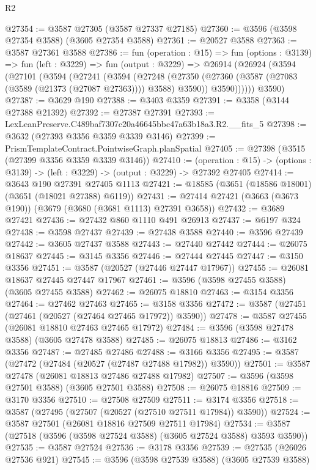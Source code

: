 \begin{lexlean}{R2}
\begin{coremodule}
@27354 := @3587 @27305 (@3587 @27337 @27185)
@27360 := @3596 (@3598 @27354 @3588) (@3605 @27354 @3588)
@27361 := @20527 @3588
@27363 := @3587 @27361 @3588
@27386 := fun (operation : @15) =>
  fun (options : @3139) =>
  fun (left : @3229) =>
  fun (output : @3229) =>
  @26914
    (@26924
      (@3594
        (@27101
          (@3594
            (@27241
              (@3594
                (@27248
                  (@27350 (@27360 (@3587 (@27083 (@3589 (@21373 (@27087 @27363)))) @3588) @3590))
                  @3590))))))
      @3590)
@27387 := @3629 @190
@27388 := @3403 @3359
@27391 := @3358 (@3144 @27388 @21392)
@27392 := @27387 @27391
@27393 := LexLeanPreserve.C489baf7307c20a46645bbc47a63b18a3.R2.__fits_5
@27398 := @3632 (@27393 @3356 @3359 @3339 @3146)
@27399 := PrismTemplateContract.PointwiseGraph.planSpatial
@27405 := @27398 (@3515 (@27399 @3356 @3359 @3339 @3146))
@27410 := (operation : @15) ->
  (options : @3139) -> (left : @3229) -> (output : @3229) -> @27392 @27405
@27414 := @3643 @190 @27391 @27405 @1113
@27421 := @18585 (@3651 (@18586 @18001) (@3651 (@18021 @27388) @6119))
@27431 := @27414 @27421 (@3663 (@3673 @190)) (@3679 (@3680 (@3681 @1113) @27391 @3658))
@27432 := @3689 @27421
@27436 := @27432 @860 @1110 @491 @26913
@27437 := @6197 @324
@27438 := @3598 @27437
@27439 := @27438 @3588
@27440 := @3596 @27439
@27442 := @3605 @27437 @3588
@27443 := @27440 @27442
@27444 := @26075 @18637
@27445 := @3145 @3356
@27446 := @27444 @27445
@27447 := @3150 @3356
@27451 := @3587 (@20527 (@27446 @27447 @17967))
@27455 := @26081 @18637 @27445 @27447 @17967
@27461 := @3596 (@3598 @27455 @3588) (@3605 @27455 @3588)
@27462 := @26075 @18810
@27463 := @3154 @3356
@27464 := @27462 @27463
@27465 := @3158 @3356
@27472 := @3587 (@27451 (@27461 (@20527 (@27464 @27465 @17972)) @3590))
@27478 := @3587 @27455 (@26081 @18810 @27463 @27465 @17972)
@27484 := @3596 (@3598 @27478 @3588) (@3605 @27478 @3588)
@27485 := @26075 @18813
@27486 := @3162 @3356
@27487 := @27485 @27486
@27488 := @3166 @3356
@27495 := @3587 (@27472 (@27484 (@20527 (@27487 @27488 @17982)) @3590))
@27501 := @3587 @27478 (@26081 @18813 @27486 @27488 @17982)
@27507 := @3596 (@3598 @27501 @3588) (@3605 @27501 @3588)
@27508 := @26075 @18816
@27509 := @3170 @3356
@27510 := @27508 @27509
@27511 := @3174 @3356
@27518 := @3587 (@27495 (@27507 (@20527 (@27510 @27511 @17984)) @3590))
@27524 := @3587 @27501 (@26081 @18816 @27509 @27511 @17984)
@27534 := @3587 (@27518 (@3596 (@3598 @27524 @3588) (@3605 @27524 @3588) @3593 @3590))
@27535 := @3587 @27524
@27536 := @3178 @3356
@27539 := @27535 (@26026 @27536 @921)
@27545 := @3596 (@3598 @27539 @3588) (@3605 @27539 @3588)

\end{coremodule}
\end{lexlean}
